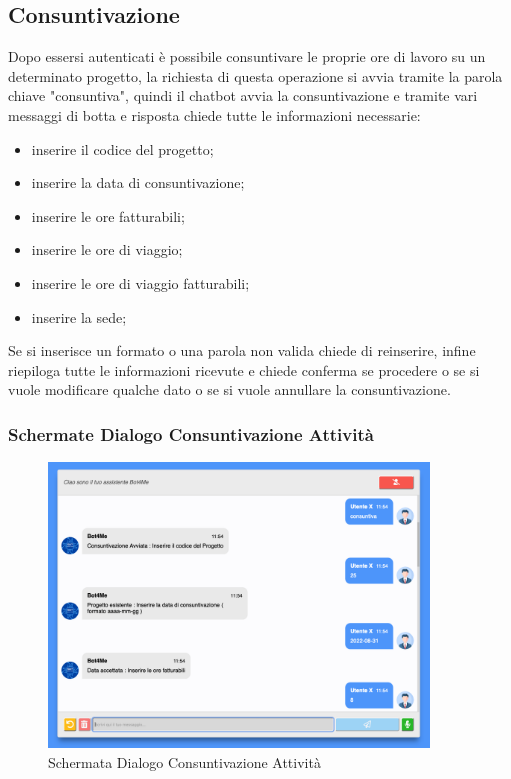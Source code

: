 \subsection{Consuntivazione}
Dopo essersi autenticati è possibile consuntivare le proprie ore di lavoro su un determinato progetto, la richiesta di questa operazione si avvia tramite la parola chiave "consuntiva", quindi il chatbot avvia la consuntivazione e tramite vari messaggi di botta e risposta chiede tutte le informazioni necessarie:
\begin{itemize}
    \item inserire il codice del progetto;
    \item inserire la data di consuntivazione;
    \item inserire le ore fatturabili;
    \item inserire le ore di viaggio;
    \item inserire le ore di viaggio fatturabili;
    \item inserire la sede;
\end{itemize}
Se si inserisce un formato o una parola non valida chiede di reinserire, infine riepiloga tutte le informazioni ricevute e chiede conferma se procedere o se si vuole modificare qualche dato o se si vuole annullare la consuntivazione. 
\subsubsection{Schermate Dialogo Consuntivazione Attività}
\begin{figure}[H]
    \centering\includegraphics[width=0.9\textwidth, height=0.7\textheight, keepaspectratio]{images/schermata_consultivazione_1.png}
    \caption{Schermata Dialogo Consuntivazione Attività}
\end{figure}

